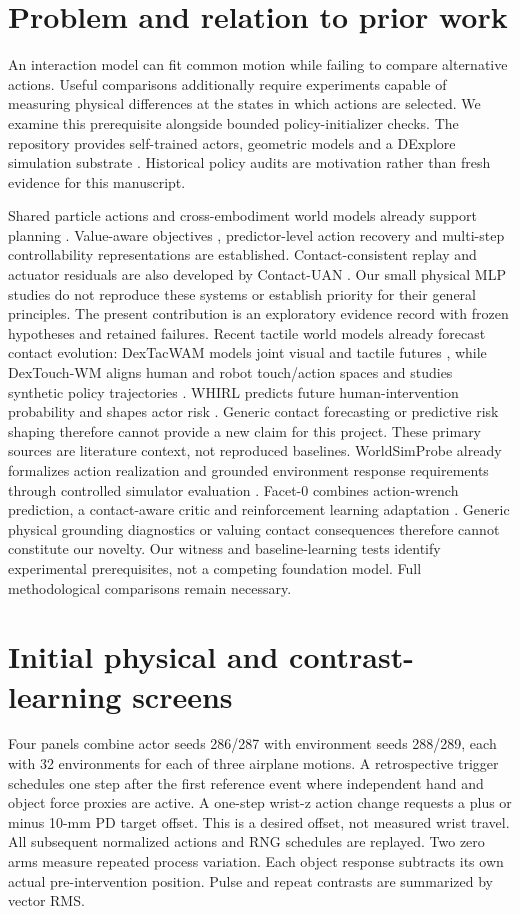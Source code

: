 \documentclass[10pt]{article}
\begin{document}
\section{Problem and relation to prior work}
An interaction model can fit common motion while failing to compare alternative actions.
Useful comparisons additionally require experiments capable of measuring physical
differences at the states in which actions are selected. We examine this prerequisite
alongside bounded policy-initializer checks. The repository provides self-trained
actors, geometric models and a DExplore simulation substrate \cite{xu2025}. Historical
policy audits are motivation rather than fresh evidence for this manuscript.

Shared particle actions and cross-embodiment world models already support planning
\cite{he2025}. Value-aware objectives \cite{farahmand2017}, predictor-level action
recovery \cite{qiu2026} and multi-step controllability representations \cite{rudolph2024}
are established. Contact-consistent replay and actuator residuals are also developed
by Contact-UAN \cite{fey2026}. Our small physical MLP studies do not reproduce these
systems or establish priority for their general principles. The present contribution
is an exploratory evidence record with frozen hypotheses and retained failures.
Recent tactile world models already forecast contact evolution: DexTacWAM models
joint visual and tactile futures \cite{yuan2026}, while DexTouch-WM aligns human
and robot touch/action spaces and studies synthetic policy trajectories
\cite{qin2026}. WHIRL predicts future human-intervention probability and shapes
actor risk \cite{yin2026}. Generic contact forecasting or predictive risk shaping
therefore cannot provide a new claim for this project. These primary sources
are literature context, not reproduced baselines.
WorldSimProbe already formalizes action realization and grounded environment
response requirements through controlled simulator evaluation \cite{co2026}.
Facet-0 combines action-wrench prediction, a contact-aware critic and reinforcement
learning adaptation \cite{deng2026}. Generic physical grounding diagnostics or
valuing contact consequences therefore cannot constitute our novelty. Our witness
and baseline-learning tests identify experimental prerequisites, not a competing
foundation model. Full methodological comparisons remain necessary.

\section{Initial physical and contrast-learning screens}
Four panels combine actor seeds 286/287 with environment seeds 288/289, each with
32 environments for each of three airplane motions. A retrospective trigger schedules
one step after the first reference event where independent hand and object force
proxies are active. A one-step wrist-z action change requests a plus or minus 10-mm
PD target offset. This is a desired offset, not measured wrist travel. All subsequent
normalized actions and RNG schedules are replayed. Two zero arms measure repeated
process variation. Each object response subtracts its own actual pre-intervention
position. Pulse and repeat contrasts are summarized by vector RMS.
\end{document}
